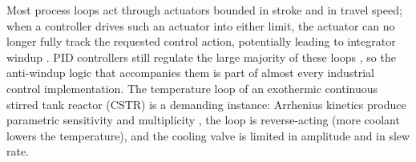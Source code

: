 Most process loops act through actuators bounded in stroke and in travel speed; when a controller drives such an actuator into either limit, the actuator can no longer fully track the requested control action, potentially leading to integrator windup \cite{astrom1989windup, hippe2006windup, galeani2009tutorial, tarbouriech2009antiwindup}. PID controllers still regulate the large majority of these loops \cite{astrom2006pid, seborg2010process}, so the anti-windup logic that accompanies them is part of almost every industrial control implementation. The temperature loop of an exothermic continuous stirred tank reactor (CSTR) is a demanding instance: Arrhenius kinetics produce parametric sensitivity and multiplicity \cite{uppal1974dynamic, aris1958analysis, bequette2003process}, the loop is reverse-acting (more coolant lowers the temperature), and the cooling valve is limited in amplitude and in slew rate.

